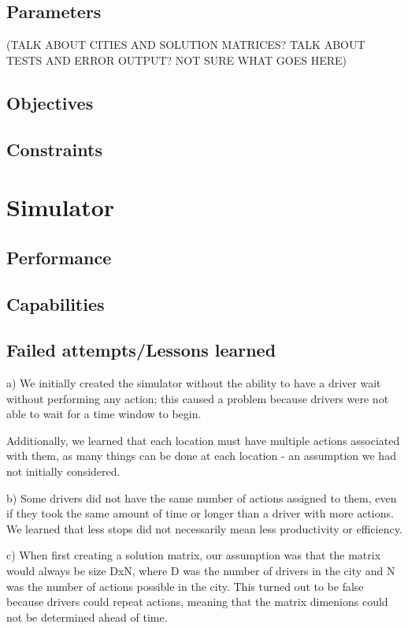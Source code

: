\documentclass{article}
\begin{document}
\subsection{Parameters}
(TALK ABOUT CITIES AND SOLUTION MATRICES?  TALK ABOUT TESTS AND ERROR OUTPUT? NOT SURE WHAT GOES HERE)
\subsection{Objectives}

\subsection{Constraints}
\section{Simulator}
\subsection{Performance}
\subsection{Capabilities}
\subsection{Failed attempts/Lessons learned}

a) We initially created the simulator without the ability to have a driver wait without performing any action; this caused a problem because drivers were not able to wait for a time window to begin.  





Additionally, we learned that each location must have multiple actions associated with them, as many things can be done at each location - an assumption we had not initially considered.

b) Some drivers did not have the same number of actions assigned to them, even if they took the same amount of time or longer than a driver with more actions.  We learned that less stops did not necessarily mean less productivity or efficiency.

c) When first creating a solution matrix, our assumption was that the matrix would always be size DxN, where D was the number of drivers in the city and N was the number of actions possible in the city.  This turned out to be false because drivers could repeat actions, meaning that the matrix dimenions could not be determined ahead of time.
\end{document}
